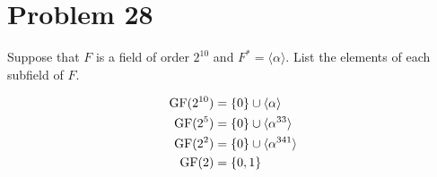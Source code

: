 \documentclass{article}
\begin{document}
\section*{Problem 28}

Suppose that $F$ is a field of order $2^{10}$ and $F^{*}=\langle\alpha\rangle$.
List the elements of each subfield of $F$.

\begin{align*}
\mbox{GF}(2^{10}) &= \{0\}\cup\langle\alpha\rangle \\
\mbox{GF}(2^5) &= \{0\}\cup\langle\alpha^{33}\rangle \\
\mbox{GF}(2^2) &= \{0\}\cup\langle\alpha^{341}\rangle \\
\mbox{GF}(2) &= \{0,1\}
\end{align*}
\end{document}
